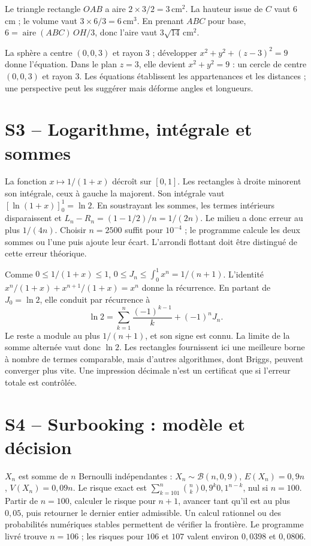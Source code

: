 Le triangle rectangle $OAB$ a aire $2\times3/2=3\,\mathrm{cm}^2$. La hauteur issue de $C$ vaut $6$ cm ; le volume vaut $3\times6/3=6\,\mathrm{cm}^3$. En prenant $ABC$ pour base, $6=\operatorname{aire}(ABC)\,OH/3$, donc l'aire vaut $3\sqrt{14}\,\mathrm{cm}^2$.

La sphère a centre $(0,0,3)$ et rayon $3$ ; développer $x^2+y^2+(z-3)^2=9$ donne l'équation. Dans le plan $z=3$, elle devient $x^2+y^2=9$ : un cercle de centre $(0,0,3)$ et rayon $3$. Les équations établissent les appartenances et les distances ; une perspective peut les suggérer mais déforme angles et longueurs.

\section{S3 -- Logarithme, intégrale et sommes}
La fonction $x\mapsto1/(1+x)$ décroît sur $[0,1]$. Les rectangles à droite minorent son intégrale, ceux à gauche la majorent. Son intégrale vaut $[\ln(1+x)]_0^1=\ln2$. En soustrayant les sommes, les termes intérieurs disparaissent et $L_n-R_n=(1-1/2)/n=1/(2n)$.
Le milieu a donc erreur au plus $1/(4n)$. Choisir $n=2500$ suffit pour $10^{-4}$ ; le programme calcule les deux sommes ou l'une puis ajoute leur écart. L'arrondi flottant doit être distingué de cette erreur théorique.

Comme $0\le1/(1+x)\le1$, $0\le J_n\le\int_0^1x^n=1/(n+1)$. L'identité $x^n/(1+x)+x^{n+1}/(1+x)=x^n$ donne la récurrence. En partant de $J_0=\ln2$, elle conduit par récurrence à
\[
\ln2=\sum_{k=1}^{n}\frac{(-1)^{k-1}}k+(-1)^nJ_n.
\]
Le reste a module au plus $1/(n+1)$, et son signe est connu. La limite de la somme alternée vaut donc $\ln2$. Les rectangles fournissent ici une meilleure borne à nombre de termes comparable, mais d'autres algorithmes, dont Briggs, peuvent converger plus vite. Une impression décimale n'est un certificat que si l'erreur totale est contrôlée.

\section{S4 -- Surbooking : modèle et décision}
$X_n$ est somme de $n$ Bernoulli indépendantes : $X_n\sim\mathcal B(n,0{,}9)$, $E(X_n)=0{,}9n$, $V(X_n)=0{,}09n$. Le risque exact est
$\sum_{k=101}^n\binom nk0{,}9^k0{,}1^{n-k}$, nul si $n=100$.
Partir de $n=100$, calculer le risque pour $n+1$, avancer tant qu'il est au plus $0{,}05$, puis retourner le dernier entier admissible. Un calcul rationnel ou des probabilités numériques stables permettent de vérifier la frontière. Le programme livré trouve $n=106$ ; les risques pour $106$ et $107$ valent environ $0{,}0398$ et $0{,}0806$.

